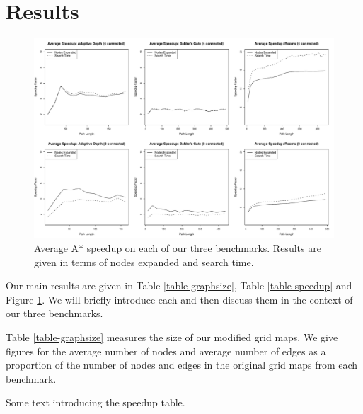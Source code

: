 \section{Results}
\label{sec-results}

\begin{figure}[t]
       \begin{center}
                       \includegraphics[width=1.95\columnwidth, trim = 10mm 10mm 10mm 0mm]{diagrams/speedup.pdf}
       \end{center}
       \caption{Average A* speedup on each of our three benchmarks. 
		Results are given in terms of nodes expanded and search time.}
\label{fig-speedup}
\end{figure}

Our main results are given in Table \ref{table-graphsize}, Table
\ref{table-speedup} and Figure \ref{fig-speedup}.
We will briefly introduce each and then discuss them in the context
of our three benchmarks.
\par
Table \ref{table-graphsize} measures the size of our modified grid maps.
We give figures for the average number of nodes and average number of edges
as a proportion of the number of nodes and edges in the original grid maps
from each benchmark.




Some text introducing the speedup table.



